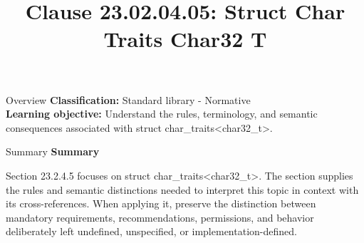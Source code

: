\documentclass[10pt,letterpaper]{article}
\title{Clause 23.02.04.05: Struct Char Traits Char32 T}
\author{}
\date{}
\begin{document}
\maketitle
\begin{CornellOverviewBox}{Overview}
\textbf{Classification:} Standard library - Normative\\[2pt]
\textbf{Learning objective:} Understand the rules, terminology, and semantic consequences associated with struct char\_traits<char32\_t>.
\end{CornellOverviewBox}\begin{CornellSummaryBox}{Summary}
{\sffamily\bfseries\color{Accent} Summary}\par\vspace{3pt}Section 23.2.4.5 focuses on struct char\_traits<char32\_t>. The section supplies the rules and semantic distinctions needed to interpret this topic in context with its cross-references. When applying it, preserve the distinction between mandatory requirements, recommendations, permissions, and behavior deliberately left undefined, unspecified, or implementation-defined.
\end{CornellSummaryBox}
\end{document}
